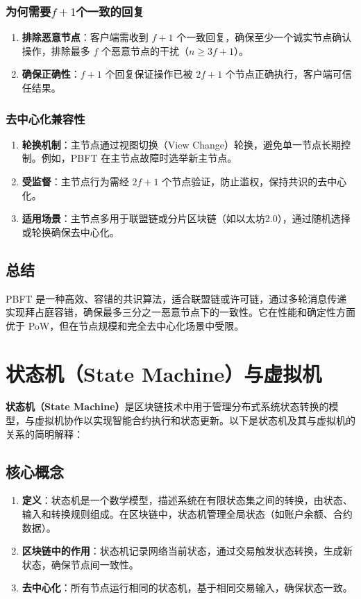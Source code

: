 \documentclass[12pt]{ctexart}
\begin{document}
\subsubsection{\texorpdfstring{为何需要$f+1$个一致的回复}{为何需要f+1个一致的回复}}
\begin{enumerate}
    \item \textbf{排除恶意节点}：客户端需收到 \( f + 1 \) 个一致回复，确保至少一个诚实节点确认操作，排除最多 \( f \) 个恶意节点的干扰（\( n \geq 3f + 1 \)）。
    \item \textbf{确保正确性}：\( f + 1 \) 个回复保证操作已被 \( 2f + 1 \) 个节点正确执行，客户端可信任结果。
\end{enumerate}

\subsubsection{去中心化兼容性}
\begin{enumerate}
    \item \textbf{轮换机制}：主节点通过视图切换（View Change）轮换，避免单一节点长期控制。例如，PBFT 在主节点故障时选举新主节点。
    \item \textbf{受监督}：主节点行为需经 \( 2f + 1 \) 个节点验证，防止滥权，保持共识的去中心化。
    \item \textbf{适用场景}：主节点多用于联盟链或分片区块链（如以太坊2.0），通过随机选择或轮换确保去中心化。
\end{enumerate}

\subsection{总结}
PBFT 是一种高效、容错的共识算法，适合联盟链或许可链，通过多轮消息传递实现拜占庭容错，确保最多三分之一恶意节点下的一致性。它在性能和确定性方面优于 PoW，但在节点规模和完全去中心化场景中受限。

\newpage
\section{状态机（State Machine）与虚拟机}
\textbf{状态机（State Machine）}是区块链技术中用于管理分布式系统状态转换的模型，与虚拟机协作以实现智能合约执行和状态更新。以下是状态机及其与虚拟机的关系的简明解释：

\subsection{核心概念}
\begin{enumerate}
    \item \textbf{定义}：状态机是一个数学模型，描述系统在有限状态集之间的转换，由状态、输入和转换规则组成。在区块链中，状态机管理全局状态（如账户余额、合约数据）。
    \item \textbf{区块链中的作用}：状态机记录网络当前状态，通过交易触发状态转换，生成新状态，确保节点间一致性。
    \item \textbf{去中心化}：所有节点运行相同的状态机，基于相同交易输入，确保状态一致。
\end{enumerate}
\end{document}
